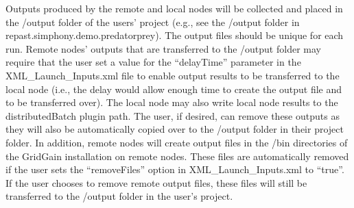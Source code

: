 \documentclass[12pt]{article}
\begin{document}
Outputs produced by the remote and local nodes will be collected and
placed in the /output folder of the users' project (e.g., see
the /output folder in repast.simphony.demo.predatorprey). The output files should be unique for
each run. Remote nodes' outputs that are transferred to the /output
folder may require that the user set a value for the ``delayTime'' parameter in the
XML\_Launch\_Inputs.xml file to enable output results to be transferred to the local node (i.e., the delay would allow enough
time to create the output file and to be transferred over). The local node
may also write local node results to the distributedBatch plugin
path. The user, if desired, can remove these outputs as they will also
be automatically copied over to the /output folder in their project folder. In addition, remote nodes will create output files in the
/bin directories of the GridGain installation on remote nodes. These files are automatically removed if the user
sets the ``removeFiles'' option in XML\_Launch\_Inputs.xml to
``true''. If the user chooses to remove remote output files, these
files will still be transferred to the /output folder in the user's project.
\end{document}
